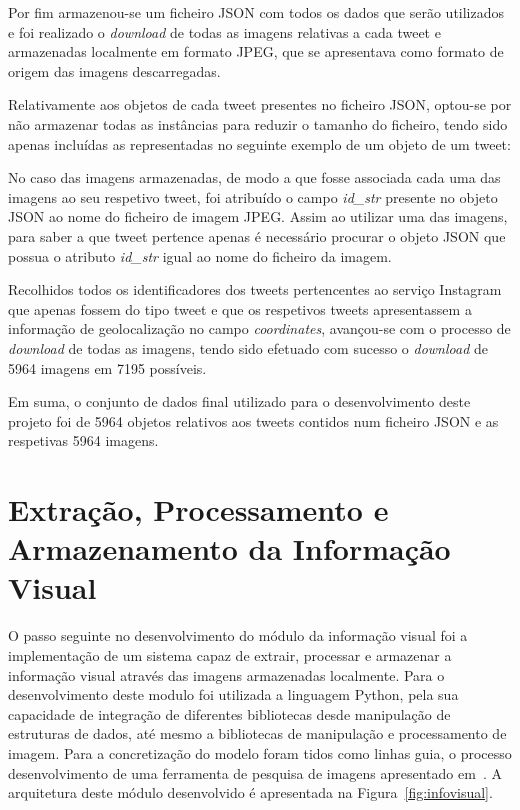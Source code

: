 Por fim armazenou-se um ficheiro JSON com todos os dados que serão utilizados e foi realizado o \textit{download} de todas as imagens relativas a cada tweet e armazenadas localmente em formato JPEG, que se apresentava como formato de origem das imagens descarregadas. 

Relativamente aos objetos de cada tweet presentes no ficheiro JSON, optou-se por não armazenar todas as instâncias para reduzir o tamanho do ficheiro, tendo sido apenas incluídas as representadas no seguinte exemplo de um objeto de um tweet:



No caso das imagens armazenadas, de modo a que fosse associada cada uma das imagens ao seu respetivo tweet, foi atribuído o campo \textit{id\_str} presente no objeto JSON ao nome do ficheiro de imagem JPEG. Assim ao utilizar uma das imagens, para saber a que tweet pertence apenas é necessário procurar o objeto JSON que possua o atributo \textit{id\_str} igual ao nome do ficheiro da imagem.

Recolhidos todos os identificadores dos tweets pertencentes ao serviço Instagram que apenas fossem do tipo tweet e que os respetivos tweets apresentassem a informação de geolocalização no campo \textit{coordinates}, avançou-se com o processo de \textit{download} de todas as imagens, tendo sido efetuado com sucesso o \textit{download} de 5964 imagens em 7195 possíveis.

Em suma, o conjunto de dados final utilizado para o desenvolvimento deste projeto foi de 5964 objetos relativos aos tweets contidos num ficheiro JSON e as respetivas 5964 imagens.

\section{Extração, Processamento e Armazenamento da Informação Visual} \label{sec:extract}

O passo seguinte no desenvolvimento do módulo da informação visual foi a implementação de um sistema capaz de extrair, processar e armazenar a informação visual através das imagens armazenadas localmente. Para o desenvolvimento deste modulo foi utilizada a linguagem Python, pela sua capacidade de integração de diferentes bibliotecas desde manipulação de estruturas de dados, até mesmo a bibliotecas de manipulação e processamento de imagem. Para a concretização do modelo foram tidos como linhas guia, o processo desenvolvimento de uma ferramenta de pesquisa de imagens apresentado em~\cite{Solem2012}. A arquitetura deste módulo desenvolvido é apresentada na Figura~\ref{fig:infovisual}.


